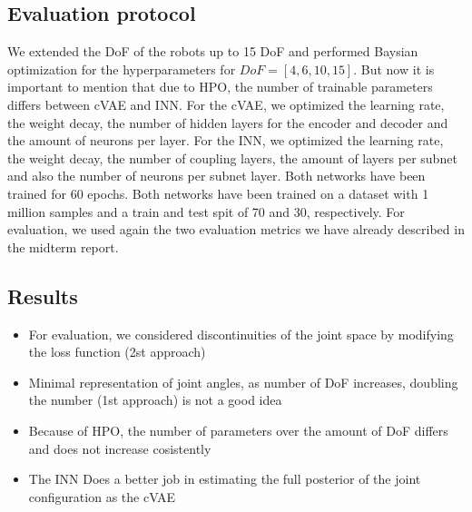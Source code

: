\documentclass[conference]{IEEEtran}
\begin{document}
\subsection*{Evaluation protocol}

We extended the DoF of the robots up to 15 DoF and performed Baysian optimization for the hyperparameters for $DoF = [4, 6, 10, 15]$. But now it is important to mention that due to HPO, the number of trainable parameters differs between cVAE and INN. 
For the cVAE, we optimized the learning rate, the weight decay, the number of hidden layers for the encoder and decoder and the amount of neurons per layer. For the INN, we optimized the learning rate, the weight decay, the number of coupling layers, the amount of layers per subnet and also the number of neurons per subnet layer. 
Both networks have been trained for 60 epochs. Both networks have been trained on a dataset with 1 million samples and a train and test spit of 70 and 30, respectively. For evaluation, we used again the two evaluation metrics  we have already described in the midterm report.

\subsection*{Results}


\begin{itemize}
	\item For evaluation, we considered discontinuities of the joint space by modifying the loss function (2st approach) 
	\item Minimal representation of joint angles, as number of DoF increases, doubling the number (1st approach) is not a good idea
	\item Because of HPO, the number of parameters over the amount of DoF differs and does not increase cosistently
	\item The INN Does a better job in estimating the full posterior of the joint configuration as the cVAE
\end{itemize}
\end{document}
